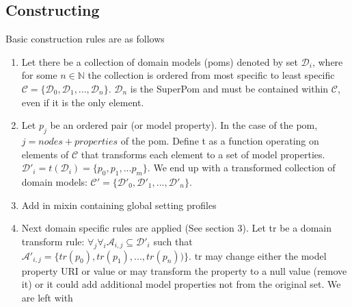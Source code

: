 \documentclass[12pt]{amsart}
\begin{document}
\subsection{Constructing}
Basic construction rules are as follows
\begin{enumerate}
\item Let there be a collection of domain models (poms) denoted by set \begin{math}\mathcal{D}_{i}\end{math}, where for some \begin{math} n \in \mathbb{N} \end{math} the collection is ordered from most specific to least specific \begin{math}\mathcal{C} = \{\mathcal{D}_{0}, \mathcal{D}_{1},...,\mathcal{D}_{n} \} \end{math}.  \begin{math}\mathcal{D}_{n}\end{math} is the SuperPom and must be contained within \begin{math}\mathcal{C}\end{math}, even if it is the only element.
\item Let \begin{math}p_j\end{math} be an ordered pair (or model property). In the case of the pom, \begin{math}j=nodes + properties\end{math} of the pom. Define t as a function operating on elements of \begin{math}\mathcal{C}\end{math} that transforms each element to a set of model properties.  \begin{math}\mathcal{D}'_{i}=t(\mathcal{D}_{i})=\{p_0,p_1,...p_m\}\end{math}. We end up with a transformed collection of domain models: \begin{math}\mathcal{C'} = \{\mathcal{D'}_{0}, \mathcal{D'}_{1},...,\mathcal{D'}_{n} \} \end{math}.  
\item Add in mixin containing global setting profiles
\item Next domain specific rules are applied (See section 3). Let tr be a domain transform rule: \begin{math}
\forall_j \forall_i \mathcal{A}_{i,j}  \subseteq \mathcal{D'}_{i} \end{math} such that \begin{math}  \mathcal{A'}_{i,j} = \{tr(p_0), tr(p_1),...,tr(p_n))\}. \end{math} tr may change either the model property URI or value or may transform the property to a null value (remove it) or it could add additional model properties not from the original set.  We are left with \begin{math}

\end{math}
\end{enumerate}
\end{document}
